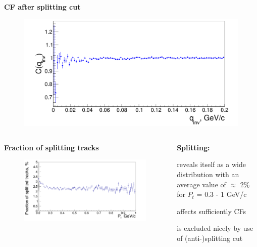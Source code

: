 \documentclass[dvipsnames] {beamer}
\begin{document}
\begin{frame}
\begin{columns}[c]
     \begin{block}{\bf \centering CF after splitting cut}
       \begin{figure}[H]
         \includegraphics[width=1.\textwidth]{CFsAfterSplitSuppressed.png}
       \end{figure}
     \end{block}
  \end{columns}
  \begin{columns}[c]
    \begin{block}{\bf \centering Fraction of splitting tracks}
       \begin{figure}[H]
        \includegraphics[width=1.\textwidth]{splitPionTracks.png}
       \end{figure}
     \end{block}
    \begin{block}{\bf \centering Splitting: }
      \begin{itemize}
{\small
        \item reveals itself as a wide distribution with an average value of $\approx$ 2\% for $P_{t}$ = 0.3 - 1 GeV/c 
        \item affects sufficiently CFs
        \item is excluded nicely by use of (anti-)splitting cut
}
      \end{itemize}
    \end{block}
  \end{columns}
\end{frame}
\end{document}
